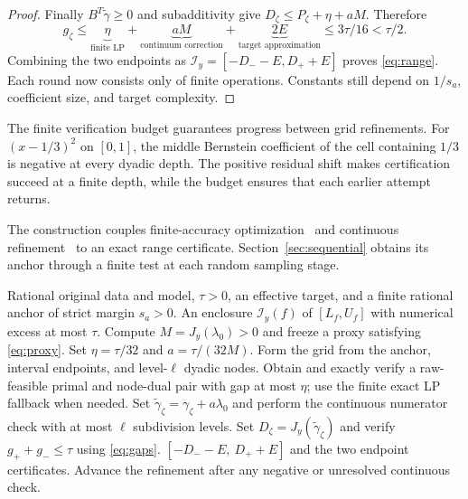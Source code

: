 \documentclass[10pt]{amsart}
\theoremstyle{definition}
\theoremstyle{remark}
\theoremstyle{plain}
\begin{document}
\begin{proof}
Finally $B^T\widetilde\gamma\ge0$ and subadditivity give $D_\zeta\le P_\zeta+\eta+aM$. Therefore
\begin{equation}\label{eq:threebudget}
 g_\zeta\le
 \underbrace{\eta}_{\text{finite LP}}
 +\underbrace{aM}_{\text{continuum correction}}
 +\underbrace{2E}_{\text{target approximation}}
 \le 3\tau/16<\tau/2.
\end{equation}
Combining the two endpoints as $\mathcal I_y=[-D_--E,D_++E]$ proves \eqref{eq:range}. Each round now consists only of finite operations. Constants still depend on $1/s_a$, coefficient size, and target complexity.
\end{proof}

The finite verification budget guarantees progress between grid refinements. For $(x-1/3)^2$ on $[0,1]$, the middle Bernstein coefficient of the cell containing $1/3$ is negative at every dyadic depth. The positive residual shift makes certification succeed at a finite depth, while the budget ensures that each earlier attempt returns.

The construction couples finite-accuracy optimization~\cite{schmid} and continuous refinement~\cite{grid} to an exact range certificate. Section~\ref{sec:sequential} obtains its anchor through a finite test at each random sampling stage.


\begin{algorithm}[tb]
\caption{Certified continuous-range refinement}\label{alg:range}
\begin{algorithmic}[1]
\Require Rational original data and model, $\tau>0$, an effective target, and a finite rational anchor of strict margin $s_a>0$.
\Ensure An enclosure $\mathcal I_y(f)$ of $[L_f,U_f]$ with numerical excess at most $\tau$.
\State Compute $M=J_y(\lambda_0)>0$ and freeze a proxy satisfying \eqref{eq:proxy}.
\State Set $\eta=\tau/32$ and $a=\tau/(32M)$.
  \State Form the grid from the anchor, interval endpoints, and level-$\ell$ dyadic nodes.
    \State Obtain and exactly verify a raw-feasible primal and node-dual pair with gap at most $\eta$; use the finite exact LP fallback when needed.
    \State Set $\widetilde\gamma_\zeta=\gamma_\zeta+a\lambda_0$ and perform the continuous numerator check with at most $\ell$ subdivision levels.
  \EndFor
    \State Set $D_\zeta=J_y(\widetilde\gamma_\zeta)$ and verify $g_++g_-\le\tau$ using \eqref{eq:gaps}.
      \State \Return $[-D_- -E,\ D_+ +E]$ and the two endpoint certificates.
    \EndIf
  \EndIf
  \State Advance the refinement after any negative or unresolved continuous check.
\EndFor
\end{algorithmic}
\end{algorithm}
\end{document}

